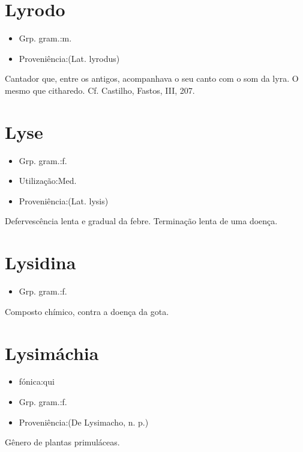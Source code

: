 \section{Lyrodo}
\begin{itemize}
\item {Grp. gram.:m.}
\end{itemize}
\begin{itemize}
\item {Proveniência:(Lat. \textunderscore lyrodus\textunderscore )}
\end{itemize}
Cantador que, entre os antigos, acompanhava o seu canto com o som da lyra.
O mesmo que \textunderscore citharedo\textunderscore . Cf. Castilho, \textunderscore Fastos\textunderscore , III, 207.
\section{Lyse}
\begin{itemize}
\item {Grp. gram.:f.}
\end{itemize}
\begin{itemize}
\item {Utilização:Med.}
\end{itemize}
\begin{itemize}
\item {Proveniência:(Lat. \textunderscore lysis\textunderscore )}
\end{itemize}
Defervescência lenta e gradual da febre.
Terminação lenta de uma doença.
\section{Lysidina}
\begin{itemize}
\item {Grp. gram.:f.}
\end{itemize}
Composto chímico, contra a doença da gota.
\section{Lysimáchia}
\begin{itemize}
\item {fónica:qui}
\end{itemize}
\begin{itemize}
\item {Grp. gram.:f.}
\end{itemize}
\begin{itemize}
\item {Proveniência:(De \textunderscore Lysimacho\textunderscore , n. p.)}
\end{itemize}
Gênero de plantas primuláceas.
